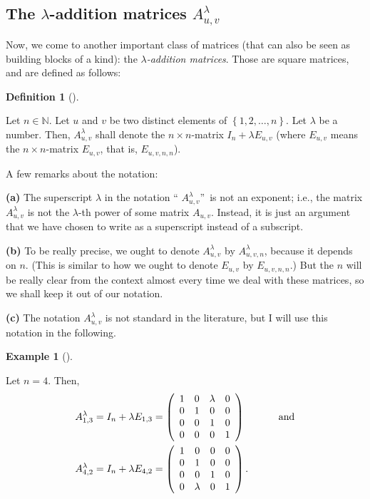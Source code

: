 \documentclass[numbers=enddot,12pt,final,onecolumn,notitlepage]{scrartcl}%
\theoremstyle{definition}
\newtheorem{defi}[theo]{Definition}
\newenvironment{definition}[1][]
{\begin{defi}[#1]\begin{leftbar}}
{\end{leftbar}\end{defi}}
\newtheorem{exam}[theo]{Example}
\newenvironment{example}[1][]
{\begin{exam}[#1]\begin{leftbar}}
{\end{leftbar}\end{exam}}
\begin{document}
\subsection{The $\lambda$-addition matrices $A_{u,v}^{\lambda}$}

Now, we come to another important class of matrices (that can also be seen as
building blocks of a kind): the $\lambda$\textit{-addition matrices}. Those
are square matrices, and are defined as follows:

\begin{definition}
\label{def.Alamuv}Let $n\in\mathbb{N}$. Let $u$ and $v$ be two distinct
elements of $\left\{  1,2,\ldots,n\right\}  $. Let $\lambda$ be a number.
Then, $A_{u,v}^{\lambda}$ shall denote the $n\times n$-matrix $I_{n}+\lambda
E_{u,v}$ (where $E_{u,v}$ means the $n\times n$-matrix $E_{u,v}$, that is,
$E_{u,v,n,n}$).

A few remarks about the notation:

\textbf{(a)} The superscript $\lambda$ in the notation \textquotedblleft%
$A_{u,v}^{\lambda}$\textquotedblright\ is not an exponent; i.e., the matrix
$A_{u,v}^{\lambda}$ is not the $\lambda$-th power of some matrix $A_{u,v}$.
Instead, it is just an argument that we have chosen to write as a superscript
instead of a subscript.

\textbf{(b)} To be really precise, we ought to denote $A_{u,v}^{\lambda}$ by
$A_{u,v,n}^{\lambda}$, because it depends on $n$. (This is similar to how we
ought to denote $E_{u,v}$ by $E_{u,v,n,n}$.) But the $n$ will be really clear
from the context almost every time we deal with these matrices, so we shall
keep it out of our notation.

\textbf{(c)} The notation $A_{u,v}^{\lambda}$ is not standard in the
literature, but I will use this notation in the following.
\end{definition}

\begin{example}
\label{exam.Alamuv}Let $n=4$. Then,%
\begin{align*}
A_{1,3}^{\lambda}  &  =I_{n}+\lambda E_{1,3}=\left(
\begin{array}
[c]{cccc}%
1 & 0 & \lambda & 0\\
0 & 1 & 0 & 0\\
0 & 0 & 1 & 0\\
0 & 0 & 0 & 1
\end{array}
\right)  \ \ \ \ \ \ \ \ \ \ \text{and}\\
A_{4,2}^{\lambda}  &  =I_{n}+\lambda E_{4,2}=\left(
\begin{array}
[c]{cccc}%
1 & 0 & 0 & 0\\
0 & 1 & 0 & 0\\
0 & 0 & 1 & 0\\
0 & \lambda & 0 & 1
\end{array}
\right)  .
\end{align*}

\end{example}
\end{document}
